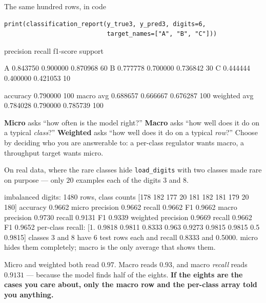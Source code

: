 \documentclass[aspectratio=169]{beamer}
\begin{document}
\begin{frame}[fragile,shrink=7]{The same hundred rows, in code}
\begin{lstlisting}
print(classification_report(y_true3, y_pred3, digits=6,
                            target_names=["A", "B", "C"]))
\end{lstlisting}
\begin{outblk}
              precision    recall  f1-score   support

           A   0.843750  0.900000  0.870968        60
           B   0.777778  0.700000  0.736842        30
           C   0.444444  0.400000  0.421053        10

    accuracy                       0.790000       100
   macro avg   0.688657  0.666667  0.676287       100
weighted avg   0.784028  0.790000  0.785739       100
\end{outblk}
\begin{exampleblock}{}
  \centering\small
  \textbf{Micro} asks ``how often is the model right?'' \textbf{Macro} asks
  ``how well does it do on a typical \emph{class}?'' \textbf{Weighted} asks
  ``how well does it do on a typical \emph{row}?'' Choose by deciding who you
  are answerable to: a per-class regulator wants macro, a throughput target
  wants micro.
\end{exampleblock}
\end{frame}

\begin{frame}[fragile,shrink=7]{On real data, where the rare classes hide}
\texttt{load\_digits} with two classes made rare on purpose --- only $20$
examples each of the digits $3$ and $8$.
\begin{outblk}
imbalanced digits: 1480 rows, class counts [178 182 177  20 181 182 181 179  20 180]
accuracy 0.9662
  micro     precision 0.9662  recall 0.9662  F1 0.9662
  macro     precision 0.9730  recall 0.9131  F1 0.9339
  weighted  precision 0.9669  recall 0.9662  F1 0.9652
per-class recall: [1.     0.9818 0.9811 0.8333 0.963  0.9273 0.9815 0.9815 0.5    0.9815]
classes 3 and 8 have 6 test rows each and recall 0.8333 and 0.5000.
micro hides them completely; macro is the only average that shows them.
\end{outblk}
\begin{center}\small
  Micro and weighted both read $0.97$. Macro reads $0.93$, and macro
  \emph{recall} reads $\mathbf{0.9131}$ --- because the model finds half
  of the eights. \textbf{If the eights are the cases you care about, only the
  macro row and the per-class array told you anything.}
\end{center}
\end{frame}
\end{document}
